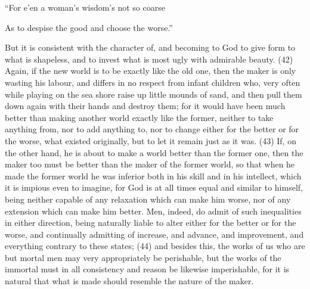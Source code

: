 ``For e'en a woman's wisdom's not so coarse

As to despise the good and choose the worse.''

But it is consistent with the character of, and becoming to God to give form to what is shapeless,
and to invest what is most ugly with admirable beauty. (42) Again, if the new world is to be exactly
like the old one, then the maker is only wasting his labour, and differs in no respect from infant
children who, very often while playing on the sea shore raise up little mounds of sand, and then pull
them down again with their hands and destroy them; for it would have been much better than
making another world exactly like the former, neither to take anything from, nor to add anything to,
nor to change either for the better or for the worse, what existed originally, but to let it remain just
as it was. (43) If, on the other hand, he is about to make a world better than the former one, then
the maker too must be better than the maker of the former world, so that when he made the former
world he was inferior both in his skill and in his intellect, which it is impious even to imagine, for God
is at all times equal and similar to himself, being neither capable of any relaxation which can make
him worse, nor of any extension which can make him better. Men, indeed, do admit of such
inequalities in either direction, being naturally liable to alter either for the better or for the worse,
and continually admitting of increase, and advance, and improvement, and everything contrary to
these states; (44) and besides this, the works of us who are but mortal men may very appropriately
be perishable, but the works of the immortal must in all consistency and reason be likewise
imperishable, for it is natural that what is made should resemble the nature of the maker.

